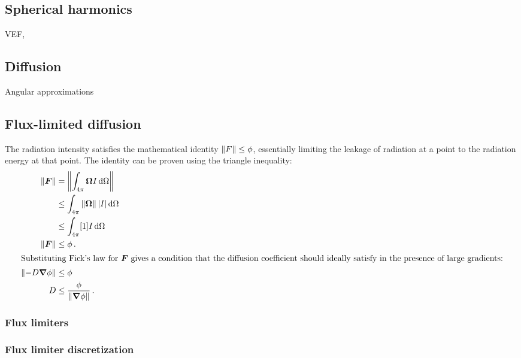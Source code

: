 \subsection{Spherical harmonics}
\cite{Ols2000,McC2008a}

VEF, \Pone

\subsection{Diffusion}\label{sec:diffusion}

Angular approximations

\subsection{Flux-limited diffusion}\label{sec:fldBackground}

The radiation intensity satisfies the mathematical identity $\left\| F \right\| \le \phi$,
essentially limiting the leakage of radiation at a point to the radiation
energy at that point. The identity can be proven using the triangle inequality:
\begin{align*}
  \left\| \bm{F} \right\| &= \left\|  \int_{4\pi} \bm{\Omega} I \mathop{}\!\mathrm{d} \Omega \right\|
  \\&\le \int_{4\pi} \left\| \bm{\Omega} \right\| \left| I \right| \mathop{}\!\mathrm{d} \Omega 
  \\
  &\le \int_{4\pi} [1] I \mathop{}\!\mathrm{d}\Omega
  \\
  \left\| \bm{F} \right\| &\le \phi\,.
  \\ 
  \intertext{Substituting Fick's law for $\bm{F}$ gives a condition that the
  diffusion coefficient should ideally satisfy in the presence of large
  gradients:}
  \left\| - D \bm{\nabla} \phi \right\| &\le \phi
  \\
  D & \le \frac{\phi}{\left\| \bm{\nabla} \phi \right\|} \,.
\end{align*}

\subsubsection{Flux limiters}

\subsubsection{Flux limiter discretization}
\cite{Ols2007}

